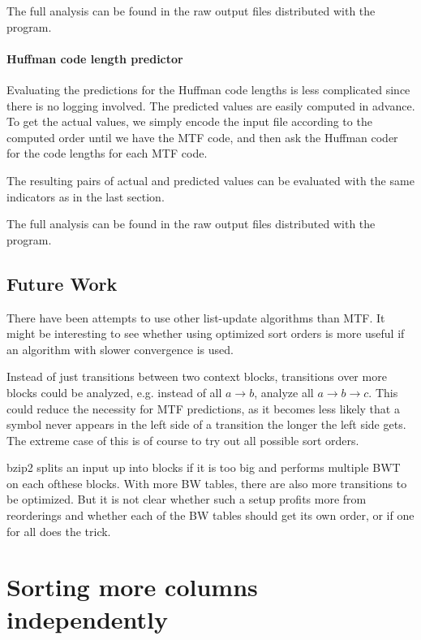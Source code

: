 \documentclass[a4paper]{scrreprt}
\begin{document}
The full analysis can be found in the raw output files distributed with the
program.

\subsubsection{Huffman code length predictor}

Evaluating the predictions for the Huffman code lengths is less complicated
since there is no logging involved. The predicted values are easily computed in
advance. To get the actual values, we simply encode the input file according to
the computed order until we have the MTF code, and then ask the Huffman coder
for the code lengths for each MTF code.

The resulting pairs of actual and predicted values can be evaluated with the
same indicators as in the last section.

The full analysis can be found in the raw output files distributed with the
program.

\section{Future Work}

There have been attempts to use other list-update algorithms than MTF. It might
be interesting to see whether using optimized sort orders is more useful if an
algorithm with slower convergence is used.

Instead of just transitions between two context blocks, transitions over more
blocks could be analyzed, e.g. instead of all \(a \rightarrow b\), analyze all
\(a \rightarrow b \rightarrow c\). This could reduce the necessity for MTF
predictions, as it becomes less likely that a symbol never appears in the left
side of a transition the longer the left side gets. The extreme case of this is
of course to try out all possible sort orders.

bzip2 splits an input up into blocks if it is too big and performs multiple BWT
on each ofthese blocks. With more BW tables, there are also more transitions to
be optimized. But it is not clear whether such a setup profits more from
reorderings and whether each of the BW tables should get its own order, or if
one for all does the trick.

\chapter{Sorting more columns independently}
\end{document}
